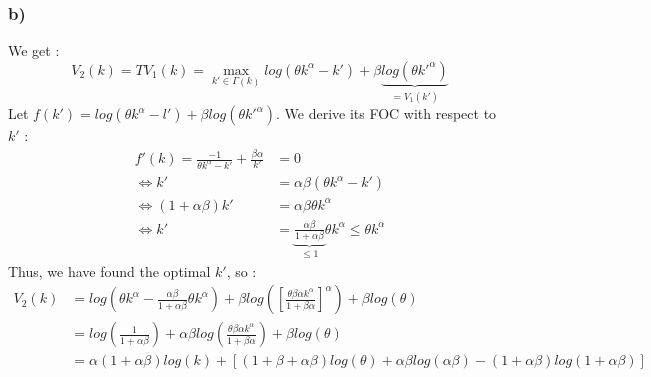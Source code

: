 \documentclass{article}
\begin{document}
\subsubsection{b)}
We get : $$V_2(k) = TV_1(k) = \max_{k'\in \Gamma (k)}log(\theta k^\alpha-k')+\beta\underbrace{log(\theta k'^\alpha)}_{=V_1(k')}$$
Let $f(k') = log(\theta k^\alpha-l') + \beta log(\theta k'^\alpha)$. We derive its FOC with respect to $k'$ : 
$$\begin{aligned}
    f'(k) = \frac{-1}{\theta k^\alpha-k'}+\frac{\beta \alpha}{k'} &= 0 \\
    \Longleftrightarrow k' &= \alpha \beta(\theta k^\alpha-k') \\
    \Longleftrightarrow (1+\alpha\beta)k' &= \alpha\beta\theta k^\alpha\\
    \Longleftrightarrow k' &= \underbrace{\frac{\alpha\beta}{1+\alpha\beta}}_{\leq 1}\theta k^\alpha \leq \theta k^\alpha 
\end{aligned}$$
Thus, we have found the optimal $k'$, so : 
$$\begin{aligned}
    V_2(k) &= log(\theta k^\alpha - \frac{\alpha\beta}{1+\alpha\beta}\theta k^\alpha) + \beta log([\frac{\theta \beta\alpha k^\alpha}{1+\beta\alpha}]^\alpha)+\beta log(\theta)\\
    &= log(\frac{1}{1+\alpha\beta})+\alpha\beta log(\frac{\theta\beta\alpha k^\alpha}{1+\beta\alpha})+\beta log(\theta)\\
    &= \alpha (1+\alpha\beta)log(k) +[(1+\beta+\alpha\beta)log(\theta)+\alpha\beta log(\alpha\beta)-(1+\alpha\beta)log(1+\alpha\beta)]
\end{aligned}$$
\end{document}
